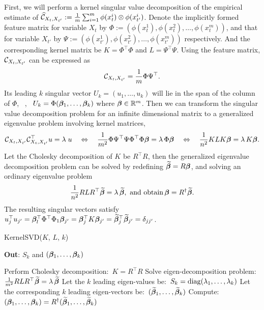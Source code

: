 \documentclass[11pt]{article}
\begin{document}
First, we will perform a kernel singular value decomposition of the empirical estimate of $\widehat {\mathcal{C}}_{X_t,X_{t'}}:= \frac{1}{m} \sum_{i=1}^m \phi(x_t^i) \otimes \phi(x_{t'}^i)$. Denote the implicitly formed feature matrix for variable $X_t$ by $\Phi := (\phi(x_t^1),  \phi(x_t^2), \ldots, \phi(x_t^m))$, and that for variable $X_{t'}$ by $\Psi := (\phi(x_{t'}^1), \phi(x_{t'}^2), \ldots, \phi(x_{t'}^m))$ respectively. And the corresponding kernel matrix be $K = \Phi^\top \Phi$ and $L = \Psi^\top \Psi$. Using the feature matrix, $\mathcal{C}_{X_t,X_{t'}}$ can be expressed as
$$
	\mathcal{C}_{X_t,X_{t'}} = \frac{1}{m} \Phi \Psi^\top.
$$
Its leading $k$ singular vector $U_k = (u_1,\ldots,u_k)$ will lie in the span of the column of  $\Phi$, \, \ie, \, $U_k = \Phi (\boldsymbol{\beta}_1,\ldots,\boldsymbol{\beta}_k)$ where $\boldsymbol{\beta} \in \mathbb{R}^m$. Then we can transform the singular value decomposition problem for an infinite dimensional matrix to a generalized eigenvalue problem involving kernel matrices,
$$
	\mathcal{C}_{X_t,X_{t'}} \mathcal{C}_{X_t,X_{t'}}^\top u = \lambda\;u
	\quad \Leftrightarrow \quad
	\frac{1}{m^2}\Phi \Psi^\top \Psi \Phi^\top \Phi \boldsymbol{\beta} = \lambda\,\Phi \boldsymbol{\beta}
	\quad \Leftrightarrow \quad
	\frac{1}{n^2} K L K \boldsymbol{\beta} = \lambda\,K \boldsymbol{\beta}.
$$
Let the Cholesky decomposition of $K$ be $R^\top R$, then the generalized eigenvalue decomposition problem can be solved by redefining $\widetilde{\boldsymbol{\beta}}=R\boldsymbol{\beta}$, and solving an ordinary eigenvalue problem
\begin{align}
 \frac{1}{n^2} R L R^\top \widetilde{\boldsymbol{\beta}} = \lambda\, \widetilde{\boldsymbol{\beta}}, \,  \, \text{and obtain} \, \boldsymbol{\beta} = R^{\dagger} \widetilde{\boldsymbol{\beta}}.
\end{align}
The resulting singular vectors satisfy $u_j^\top u_{j'} = \boldsymbol{\beta}_l^\top \Phi^\top \Phi_1 \boldsymbol{\beta}_{j'} =  \boldsymbol{\beta}_{j}^\top K  \boldsymbol{\beta}_{j'} =  \widetilde{\boldsymbol{\beta}}_{j}^\top \widetilde{\boldsymbol{\beta}}_{j'}=\delta_{jj'}$.

\begin{algorithm}[t!]
\caption{KernelSVD($K$, $L$, $k$)}
	\textbf{Out}: $S_k$ and $(\boldsymbol{\beta}_1,\ldots,\boldsymbol{\beta}_k)$\\[-0.4cm]
  \begin{algorithmic}[1]
    \STATE Perform Cholesky decomposition:\ $K=R^\top R$
    \STATE Solve eigen-decomposition problem:\ $\frac{1}{m^2} R L R^\top \widetilde{\boldsymbol{\beta}} = \lambda\,\widetilde{\boldsymbol{\beta}}$
		\STATE Let the $k$ leading eigen-values be:\ $S_k = \mathop{\mathrm{diag}}(\lambda_1,\ldots,\lambda_k)$
		\STATE Let the corresponding $k$ leading eigen-vectors be:\ $(\widetilde{\boldsymbol{\beta}}_1,\ldots,\widetilde{\boldsymbol{\beta}}_k)$
    \STATE Compute:\ $(\boldsymbol{\beta}_1,\ldots,\boldsymbol{\beta}_k) = R^\dagger (\widetilde{\boldsymbol{\beta}}_1,\ldots,\widetilde{\boldsymbol{\beta}}_k)$
  \end{algorithmic}
  \label{alg:svd}
\end{algorithm}
\end{document}
